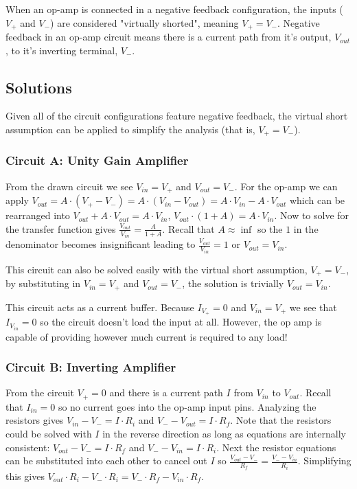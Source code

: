 \documentclass[main.tex]{subfiles}
\begin{document}

\noindent When an op-amp is connected in a negative feedback configuration, the inputs ($V_{+}$ and $V_{-}$) are considered "virtually shorted", meaning $V_{+} = V_{-}$. Negative feedback in an op-amp circuit means there is a current path from it's output, $V_{out}$, to it's inverting terminal, $V_{-}$.

\subsection{Solutions}
Given all of the circuit configurations feature negative feedback, the virtual short assumption can be applied to simplify the analysis (that is, $V_{+} = V_{-}$).


\subsubsection{Circuit A: Unity Gain Amplifier}
From the drawn circuit we see $V_{in} = V_{+}$ and $V_{out} = V_{-}$. For the op-amp we can apply $V_{out} = A \cdot (V_{+} - V_{-}) = A \cdot (V_{in} - V_{out}) = A \cdot V_{in} - A \cdot V_{out}$ which can be rearranged into $V_{out} + A \cdot V_{out} = A \cdot V_{in}$, $V_{out} \cdot (1 + A) = A \cdot V_{in}$. Now to solve for the transfer function gives $\frac{V_{out}}{V_{in}} = \frac{A}{1+A}$. Recall that $A \approx \inf$ so the $1$ in the denominator becomes insignificant leading to $\frac{V_{out}}{V_{in}} = 1$ or $V_{out} = V_{in}$.

This circuit can also be solved easily with the virtual short assumption, $V_{+} = V_{-}$, by substituting in $V_{in} = V_{+}$ and $V_{out} = V_{-}$, the solution is trivially $V_{out} = V_{in}$.

This circuit acts as a current buffer. Because $I_{V_{+}} = 0$ and $V_{in} = V_{+}$ we see that $I_{V_{in}} = 0$ so the circuit doesn't load the input at all. However, the op amp is capable of providing however much current is required to any load! 

\subsubsection{Circuit B: Inverting Amplifier}
From the circuit $V_{+} = 0$ and there is a current path $I$ from $V_{in}$ to $V_{out}$. Recall that $I_{in} = 0$ so no current goes into the op-amp input pins. Analyzing the resistors gives $V_{in} - V_{-} = I \cdot R_i$ and $V_{-} - V_{out} = I \cdot R_f$. Note that the resistors could be solved with $I$ in the reverse direction as long as equations are internally consistent: $V_{out} - V_{-} = I \cdot R_f$ and $V_{-} - V_{in} = I \cdot R_i$. Next the resistor equations can be substituted into each other to cancel out $I$ so $\frac{V_{out} - V_{-}}{R_f} = \frac{V_{-} - V_{in}}{R_i}$. Simplifying this gives $V_{out} \cdot R_i - V_{-} \cdot R_i = V_{-} \cdot R_f - V_{in} \cdot R_f$. 
\end{document}
